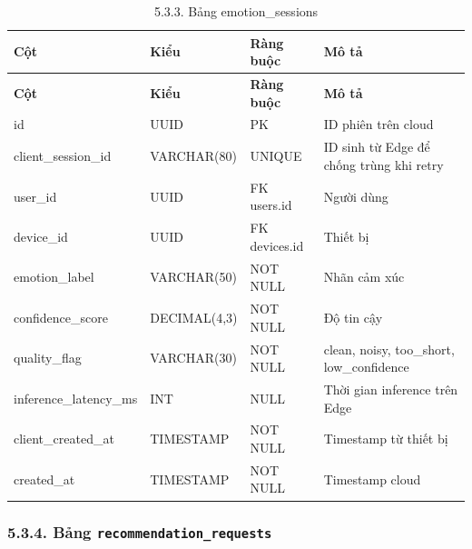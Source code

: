 \documentclass[12pt,a4paper]{article}
\begin{document}
\begin{center}
\scriptsize
\begin{longtable}{|P{0.18\textwidth}|P{0.25\textwidth}|P{0.25\textwidth}|P{0.22\textwidth}|}
\caption{5.3.3. Bảng emotion\_sessions}\\
\hline
\textbf{Cột} & \textbf{Kiểu} & \textbf{Ràng buộc} & \textbf{Mô tả} \\
\hline
\endfirsthead
\hline
\textbf{Cột} & \textbf{Kiểu} & \textbf{Ràng buộc} & \textbf{Mô tả} \\
\hline
\endhead
id & UUID & PK & ID phiên trên cloud \\
\hline
client\_session\_id & VARCHAR(80) & UNIQUE & ID sinh từ Edge để chống trùng khi retry \\
\hline
user\_id & UUID & FK users.id & Người dùng \\
\hline
device\_id & UUID & FK devices.id & Thiết bị \\
\hline
emotion\_label & VARCHAR(50) & NOT NULL & Nhãn cảm xúc \\
\hline
confidence\_score & DECIMAL(4,3) & NOT NULL & Độ tin cậy \\
\hline
quality\_flag & VARCHAR(30) & NOT NULL & clean, noisy, too\_short, low\_confidence \\
\hline
inference\_latency\_ms & INT & NULL & Thời gian inference trên Edge \\
\hline
client\_created\_at & TIMESTAMP & NOT NULL & Timestamp từ thiết bị \\
\hline
created\_at & TIMESTAMP & NOT NULL & Timestamp cloud \\
\hline
\end{longtable}
\normalsize
\end{center}

\subsubsection*{5.3.4. Bảng \texttt{recommendation\_requests}}
\end{document}
